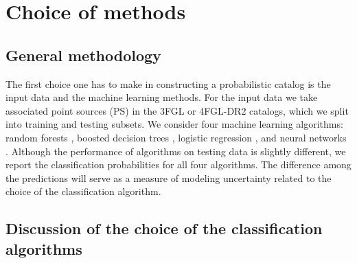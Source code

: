 \section{Choice of methods}

\subsection{General methodology}

The first choice one has to make in constructing a probabilistic catalog is the input data and the machine learning methods.
For the input data we take associated point sources (PS) in the 3FGL or 4FGL-DR2 catalogs, which we split into training and testing subsets.
We consider four machine learning algorithms: random forests \citep[RF,][]{709601, Breiman:2001hzm}, 
boosted decision trees \citep[BDT,][]{friedman2001},  
logistic regression \citep[LR,][]{cox1958}, 
and neural networks \citep[NN,][]{Hopfield:1982pe}.
Although the performance of algorithms on testing data is slightly different, 
we report the classification probabilities for all four algorithms.
The difference among the predictions will serve as a measure of modeling uncertainty related 
to the choice of the classification algorithm.

\subsection{Discussion of the choice of the classification algorithms}


